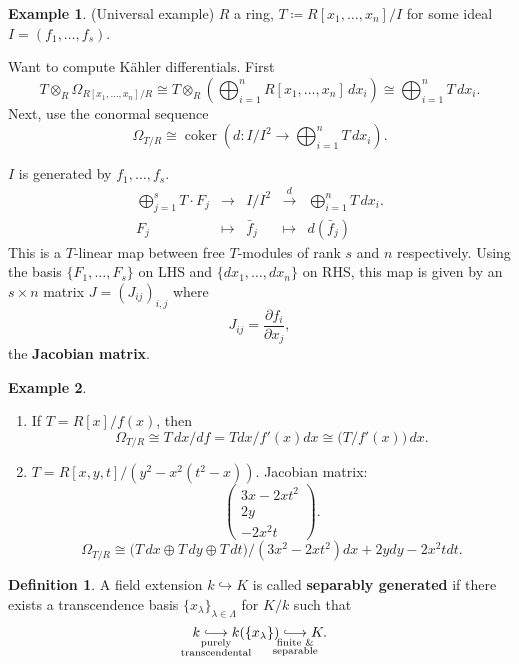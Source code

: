 \documentclass[12pt]{article}
\DeclareMathOperator{\coker}{coker}
\theoremstyle{definition}
\newtheorem*{definition}{Definition}
\newtheorem*{example}{Example}
\begin{document}
\begin{example}
(Universal example) $R$ a ring, $T\coloneqq R[x_1,\ldots,x_n]/I$ for some ideal $I=(f_1,\ldots,f_s)$.

Want to compute K\"ahler differentials. First
\[T\otimes_R\Omega_{R[x_1,\ldots,x_n]/R}\cong T\otimes_R\left(\bigoplus_{i=1}^nR[x_1,\ldots,x_n]\,dx_i\right)\cong\bigoplus_{i=1}^nT\,dx_i.\]
Next, use the conormal sequence
\[\Omega_{T/R}\cong\coker\left(d:I/I^2\rightarrow\bigoplus_{i=1}^nT\,dx_i\right).\]

$I$ is generated by $f_1,\ldots,f_s$.
\[\begin{array}{rcccl}\displaystyle{\bigoplus_{j=1}^sT\cdot F_j}&\longrightarrow&I/I^2&\overset d\longrightarrow&\displaystyle{\bigoplus_{i=1}^nT\,dx_i}.\\F_j&\longmapsto&\bar f_j&\longmapsto&d(\bar f_j)\end{array}\]
This is a $T$-linear map between free $T$-modules of rank $s$ and $n$ respectively. Using the basis $\{F_1,\ldots,F_s\}$ on LHS and $\{dx_1,\ldots,dx_n\}$ on RHS, this map is given by an $s\times n$ matrix $J=(J_{ij})_{i,j}$ where
\[J_{ij}=\frac{\partial f_i}{\partial x_j},\]
the \textbf{Jacobian matrix}.
\end{example}

\begin{example}
\begin{enumerate}[label=\alph*)]
\item If $T=R[x]/f(x)$, then
\[\Omega_{T/R}\cong T\,dx/df=Tdx/f'(x)dx\cong\big(T/f'(x)\big)\,dx.\]
\item $T=R[x,y,t]/(y^2-x^2(t^2-x))$. Jacobian matrix:
\[\left(\begin{matrix}3x-2xt^2\\2y\\-2x^2t\end{matrix}\right).\]
\[\Omega_{T/R}\cong\big(T\,dx\oplus T\,dy\oplus T\,dt\big)/(3x^2-2xt^2)dx+2ydy-2x^2tdt.\]
\end{enumerate}
\end{example}

\begin{definition}
A field extension $k\hookrightarrow K$ is called \textbf{separably generated} if there exists a transcendence basis $\{x_\lambda\}_{\lambda\in\Lambda}$ for $K/k$ such that
\[k\underset{\mathclap{\substack{\text{purely}\\\text{transcendental}}}}{\lhook\joinrel\longrightarrow}k(\{x_\lambda\})\underset{\mathclap{\substack{\text{finite \&}\\\text{separable}}}}{\lhook\joinrel\longrightarrow}K.\]
\end{definition}
\end{document}
